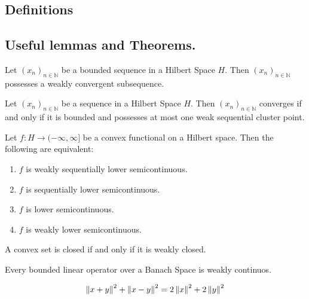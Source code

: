 \subsection{Definitions}
\subsection{Useful lemmas and Theorems.}
\begin{lemma}
	Let $(x_n)_{n \in \mathbb{N}}$ be a bounded sequence in a Hilbert Space $H$. Then $(x_n)_{n \in \mathbb{N}}$ possesses a weakly convergent subsequence.
\end{lemma}

\begin{lemma}
Let $(x_n)_{n \in \mathbb{N}}$ be a sequence in a Hilbert Space $H$. Then $(x_n)_{n \in \mathbb{N}}$ converges if and only if it is bounded and possesses at most one weak sequential cluster point.
\end{lemma}

\begin{theorem} 
	Let $f: H \rightarrow (−\infty, \infty]$ be a convex functional on a Hilbert space. Then the following are equivalent:
	\begin{enumerate}[label=(\roman{*})]
\item 	$f$ is weakly sequentially lower semicontinuous.
\item 	$f$ is sequentially lower semicontinuous.
\item 	$f$ is lower semicontinuous.
\item 	$f$ is weakly lower semicontinuous.
	\end{enumerate}
\end{theorem}

\begin{lemma}
	A convex set is closed if and only if it is weakly closed.
\end{lemma}

\begin{lemma}
	Every bounded linear operator over a Banach Space is weakly continuos.
\end{lemma}

\begin{lemma}
	
\[
\left\lVert x+y\right\rVert^2 +\left\lVert x-y\right\rVert^2 = 2\left\lVert x\right\rVert^2+2\left\lVert y\right\rVert^2
\]
\end{lemma}

